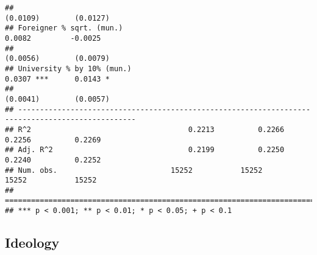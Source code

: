 \documentclass[
]{article}
\begin{document}
\begin{verbatim}
##                                                                       (0.0109)        (0.0127)   
## Foreigner % sqrt. (mun.)                                               0.0082         -0.0025    
##                                                                       (0.0056)        (0.0079)   
## University % by 10% (mun.)                                             0.0307 ***      0.0143 *  
##                                                                       (0.0041)        (0.0057)   
## -------------------------------------------------------------------------------------------------
## R^2                                    0.2213          0.2266          0.2256          0.2269    
## Adj. R^2                               0.2199          0.2250          0.2240          0.2252    
## Num. obs.                          15252           15252           15252           15252         
## =================================================================================================
## *** p < 0.001; ** p < 0.01; * p < 0.05; + p < 0.1
\end{verbatim}

\hypertarget{ideology-1}{%
\subsection{Ideology}\label{ideology-1}}
\end{document}
